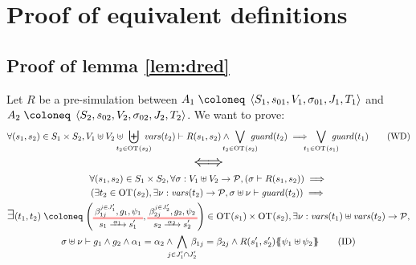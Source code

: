 \documentclass{article}
\begin{document}
\section{Proof of equivalent definitions}

\subsection{Proof of lemma \ref{lem:dred}}\label{apx:lemdred}
Let \(R\) be a pre-simulation between \(A_1 \defobject \OA{S_1}{s_{01}}{V_1}{\sigma_{01}}{J_1}{T_1}\) and \(A_2 \defobject \OA{S_2}{s_{02}}{V_2}{\sigma_{02}}{J_2}{T_2}\).
We want to prove:
\[ \forall \mpar{s_1, s_2} \in S_1 \times S_2, V_1 \uplus V_2 \uplus \biguplus_\subbox{t_2 \in \fOT{s_2}} \fvars{t_2} \vdash R\mpar{s_1, s_2} \wedge \bigvee_\subbox{t_2 \in \fOT{s_2}} \fguard{t_2} \implies \bigvee_\subbox{t_1 \in \fOT{s_1}} \fguard{t_1} \tag{WD}\label{eq:drWD} \]
\[ \text{\Large\(\displaystyle \iff\)} \]
\begin{multline}
	\forall \mpar{s_1, s_2} \in S_1 \times S_2, \forall \sigma: V_1 \uplus V_2 \to \values, \mpar{\sigma \vdash R\mpar{s_1, s_2}} \implies \\
	\mpar{\exists t_2 \in \fOT{s_2}, \exists \nu: \fvars{t_2} \to \values, \sigma \uplus \nu \vdash \fguard{t_2}} \implies \\
	\bigsymb{\exists} \mpar{t_1, t_2} \defobject \mpar{\OTx{1}{}{1}{1}, \OTx{2}{}{2}{2}} \in \fOT{s_1} \times \fOT{s_2}, \exists \nu: \fvars{t_1} \uplus \fvars{t_2} \to \values, \\
	\sigma \uplus \nu \vdash g_1 \wedge g_2 \wedge \alpha_1 = \alpha_2 \wedge \bigwedge_\subbox{j \in J'_1 \cap J'_2} \beta_{1j} = \beta_{2j} \wedge R\mpar{s'_1, s'_2}\psubst{\psi_1 \uplus \psi_2}\tag{ID}\label{eq:drID}
\end{multline}
\end{document}
